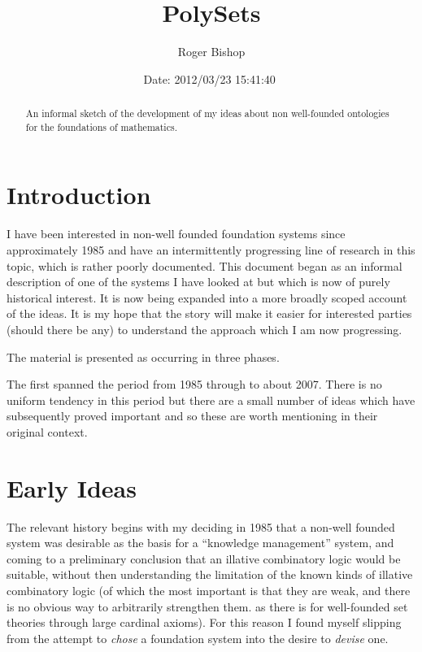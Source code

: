 \documentclass[numreferences]{rbjk}
\begin{document}
                                                                                   
\begin{article}
\begin{opening}  
\title{PolySets}
\author{Roger Bishop }
\date{$ $Date: 2012/03/23 15:41:40 $ $}

\begin{abstract}
An informal sketch of the development of my ideas about non well-founded ontologies for the foundations of mathematics.
\end{abstract}
\end{opening}

\setcounter{tocdepth}{3}
{\parskip-0pt\tableofcontents}

\section{Introduction}

I have been interested in non-well founded foundation systems since approximately 1985 and have an intermittently progressing line of research in this topic, which is rather poorly documented.
This document began as an informal description of one of the systems I have looked at but which is now of purely historical interest.
It is now being expanded into a more broadly scoped account of the ideas.
It is my hope that the story will make it easier for interested parties (should there be any) to understand the approach which I am now progressing.

The material is presented as occurring in three phases.

The first spanned the period from 1985 through to about 2007.
There is no uniform tendency in this period but there are a small number of ideas which have subsequently proved important and so these are worth mentioning in their original context.


\section{Early Ideas}

The relevant history begins with my deciding in 1985 that a non-well founded system was desirable as the basis for a ``knowledge management'' system, and coming to a preliminary conclusion that an illative combinatory logic would be suitable, without then understanding the limitation of the known kinds of illative combinatory logic (of which the most important is that they are weak, and there is no obvious way to arbitrarily strengthen them. as there is for well-founded set theories through large cardinal axioms).
For this reason I found myself slipping from the attempt to \emph{chose} a foundation system into the desire to \emph{devise} one.



\end{article}
\end{document}
